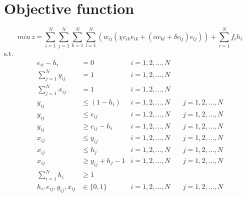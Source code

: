 \documentclass[11pt]{article} %
\begin{document}
\section{Objective function}
$$min\,z=\sum^N_{i=1}\sum^N_{j=1}\sum^N_{k=1}\sum^N_{l=1}(w_{ij}(\chi c_{ik}e_{ik}+(\alpha c_{kl}+\delta c_{lj})e_{lj})) + \sum^N_{i=1}f_{i}h_{i}$$
s.t.
\begin{align*}
e_{ii}-h_{i} &= 0 &i=1,2,\ldots,N \quad&\\
\sum^N_{j=1}y_{ij} &= 1 &i=1,2,\ldots,N \quad&\\
\sum^N_{j=1}x_{ij} &=1 &i=1,2,\ldots,N \quad&\\
y_{ij} &\leq (1-h_i) &i=1,2,\ldots,N \quad& j=1,2,\ldots,N \\
y_{ij} &\leq e_{ij} &i=1,2,\ldots,N \quad& j=1,2,\ldots,N \\
y_{ij} &\geq e_{ij}-h_i &i=1,2,\ldots,N \quad& j=1,2,\ldots,N \\
x_{ij} &\leq y_{ij} &i=1,2,\ldots,N \quad& j=1,2,\ldots,N \\
x_{ij} &\leq h_j &i=1,2,\ldots,N \quad& j=1,2,\ldots,N \\
x_{ij} &\geq y_{ij} + h_j - 1 &i=1,2,\ldots,N \quad& j=1,2,\ldots,N \\
\sum^N_{i=1}h_{i} &\geq 1 \\
h_i, e_{ij}, y_{ij}, x_{ij} &\in \{0,1\} &i=1,2,\ldots,N \quad& j=1,2,\ldots,N \\
\end{align*}
\end{document}
